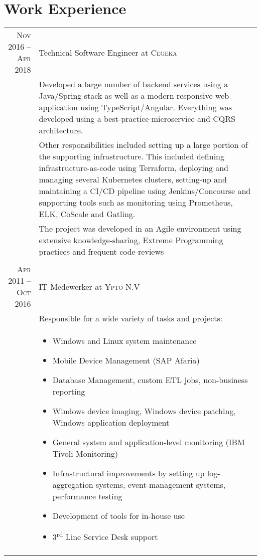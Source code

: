 \documentclass[a4paper,10pt]{article}
\begin{document}
\section{Work Experience}
	\begin{tabular}{r|p{11cm}}
	\textsc{Nov 2016 – Apr 2018} & Technical Software Engineer at \textsc{Cegeka} \\ 
	& \footnotesize{Developed a large number of backend services using a Java/Spring stack as well as a modern responsive web application using TypeScript/Angular. Everything was developed using a best-practice microservice and CQRS architecture.}\\
	& \footnotesize{Other responsibilities included setting up a large portion of the supporting infrastructure. This included defining infrastructure-as-code using Terraform, deploying and managing several Kubernetes clusters, setting-up and maintaining a CI/CD pipeline using Jenkins/Concourse and supporting tools such as monitoring using Prometheus, ELK, CoScale and Gatling.}\\
	& \footnotesize{The project was developed in an Agile environment using extensive knowledge-sharing, Extreme Programming practices and frequent code-reviews}\\
	\multicolumn{2}{c}{} \\
	
	\textsc{Apr 2011 – Oct 2016} & IT Medewerker at \textsc{Ypto} N.V \\
	& \footnotesize{Responsible for a wide variety of tasks and projects:} \\
	& \begin{minipage} [t] {0.9\textwidth} 
      	\begin{itemize}
      	\item\footnotesize{Windows and Linux system maintenance}
      	\item\footnotesize{Mobile Device Management (SAP Afaria)}
      	\item\footnotesize{Database Management, custom ETL jobs, non-business reporting}
		\item\footnotesize{Windows device imaging, Windows device patching, Windows application deployment}
		\item\footnotesize{General system and application-level monitoring (IBM Tivoli Monitoring)}
		\item\footnotesize{Infrastructural improvements by setting up log-aggregation systems, event-management systems, performance testing}
		\item\footnotesize{Development of tools for in-house use}
		\item\footnotesize{3\textsuperscript{rd} Line Service Desk support}
     	\end{itemize} 
	\end{minipage} \\
	\multicolumn{2}{c}{} \\
\end{tabular}
\end{document}
